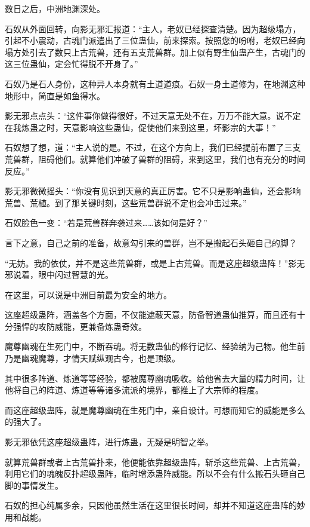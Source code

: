 
\begin{this_body}

数日之后，中洲地渊深处。

石奴从外面回转，向影无邪汇报道：“主人，老奴已经探查清楚。因为超级塌方，引起不小震动，古魂门派遣出了三位蛊仙，前来探索。按照您的吩咐，老奴已经向塌方处引去了数只上古荒兽，还有五支荒兽群。加上似有野生仙蛊产生，古魂门的这三位蛊仙，定会忙得脱不开身了。”

石奴乃是石人身份，这种异人本身就有土道道痕。石奴一身土道修为，在地渊这种地形中，简直是如鱼得水。

影无邪点点头：“这件事你做得很好，不过天意无处不在，万万不能大意。说不定在我炼蛊之时，天意影响这些蛊仙，促使他们来到这里，坏影宗的大事！”

石奴想了想，道：“主人说的是。不过，在这个方向上，我们已经提前布置了三支荒兽群，阻碍他们。就算他们冲破了兽群的阻碍，来到这里，我们也有充分的时间反应。”

影无邪微微摇头：“你没有见识到天意的真正厉害。它不只是影响蛊仙，还会影响荒兽、荒植。到了那关键时刻，这些荒兽群说不定也会冲击过来。”

石奴脸色一变：“若是荒兽群奔袭过来……该如何是好？”

言下之意，自己之前的准备，故意勾引来的兽群，岂不是搬起石头砸自己的脚？

“无妨。我的依仗，并不是这些荒兽群，或是上古荒兽。而是这座超级蛊阵！”影无邪说着，眼中闪过智慧的光。

在这里，可以说是中洲目前最为安全的地方。

这座超级蛊阵，涵盖各个方面，不仅能遮蔽天意，防备智道蛊仙推算，而且还有十分强悍的攻防威能，更兼备炼蛊奇效。

魔尊幽魂在生死门中，不断吞魂。将无数蛊仙的修行记忆、经验纳为己物。他生前乃是幽魂魔尊，才情天赋纵观古今，也是顶级。

其中很多阵道、炼道等等经验，都被魔尊幽魂吸收。给他省去大量的精力时间，让他将自己的阵道、炼道等等诸多流派的境界，都推上了大宗师的程度。

而这座超级蛊阵，就是魔尊幽魂在生死门中，亲自设计。可想而知它的威能是多么的强大了。

影无邪依凭这座超级蛊阵，进行炼蛊，无疑是明智之举。

就算荒兽群或者上古荒兽扑来，他便能依靠超级蛊阵，斩杀这些荒兽、上古荒兽，利用它们的魂魄反扑超级蛊阵，临时增添蛊阵威能。所以不会有什么搬石头砸自己脚的事情发生。

石奴的担心纯属多余，只因他虽然生活在这里很长时间，却并不知道这座蛊阵的妙用和战能。


\end{this_body}

